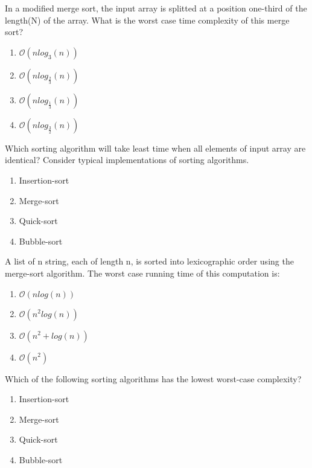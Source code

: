 \begin{problem}
In a modified merge sort, the input array is splitted at a position one-third of the length(N) of the array. What is the worst case time complexity of this merge sort?
\begin{enumerate}
\item $\mathcal{O}(nlog_3(n))$
\item $\mathcal{O}(nlog_{\frac{2}{3}}(n))$
\item $\mathcal{O}(nlog_{\frac{1}{3}}(n))$
\item $\mathcal{O}(nlog_{\frac{3}{2}}(n))$

\end{enumerate}

\end{problem}


\begin{problem}
Which sorting algorithm will take least time when all elements of input array are identical? Consider typical implementations of sorting algorithms.
\begin{enumerate}
\item Insertion-sort
\item Merge-sort
\item Quick-sort
\item Bubble-sort
\end{enumerate}

\end{problem}


\begin{problem}
A list of n string, each of length n, is sorted into lexicographic order using the merge-sort algorithm. The worst case running time of this computation is:
\begin{enumerate}
\item $\mathcal{O}(nlog(n))$
\item $\mathcal{O}(n^2log(n))$
\item $\mathcal{O}(n^2 + log(n))$
\item $\mathcal{O}(n^2)$
\end{enumerate}

\end{problem}


\begin{problem}
Which of the following sorting algorithms has the lowest worst-case complexity?
\begin{enumerate}
\item Insertion-sort
\item Merge-sort
\item Quick-sort
\item Bubble-sort
\end{enumerate}

\end{problem}




